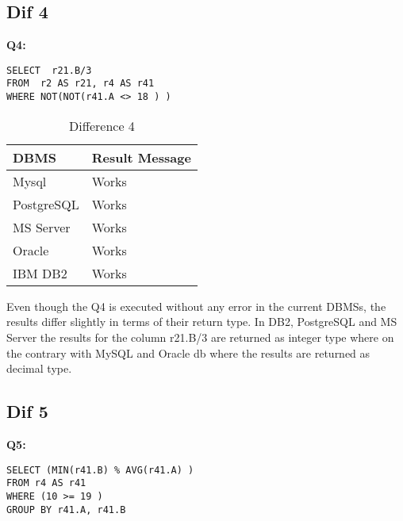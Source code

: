 \subsection{Dif 4}
  
\textbf{Q4:}
\begin{mdframed}[backgroundcolor=lightgray!20]
\begin{lstlisting}[style=SQL]
SELECT  r21.B/3
FROM  r2 AS r21, r4 AS r41
WHERE NOT(NOT(r41.A <> 18 ) )  
\end{lstlisting}
\end{mdframed}

 
\begin{table}[h]
\centering
\caption{Difference 4}
\label{my-label}
\begin{tabular}{|p{2cm}|p{11.5cm}| }
\hline
\textbf{DBMS} & \textbf{Result Message} \\ \hline
Mysql         & Works                   \\ \hline
PostgreSQL    & Works                   \\ \hline
MS Server     & Works                   \\ \hline
Oracle        & Works                   \\ \hline
IBM DB2       & Works                   \\ \hline
\end{tabular}
\end{table}

Even though the Q4 is executed without any error in the current DBMSs, the results differ slightly in terms of their return type. In DB2, PostgreSQL and MS Server the results for the column  r21.B/3  are returned as integer type where on the contrary with MySQL and Oracle db where the results are returned as decimal type. 

\subsection{Dif 5}
  
\textbf{Q5:}
\begin{mdframed}[backgroundcolor=lightgray!20]
\begin{lstlisting}[style=SQL]
SELECT (MIN(r41.B) % AVG(r41.A) ) 
FROM r4 AS r41
WHERE (10 >= 19 )     
GROUP BY r41.A, r41.B
\end{lstlisting}
\end{mdframed}

